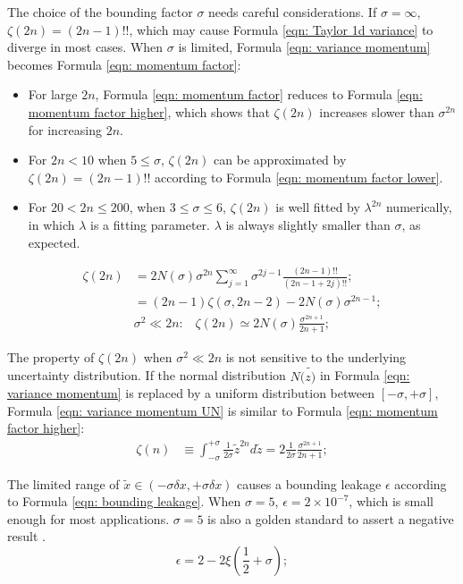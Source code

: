 \documentclass[twoside]{article}
\numberwithin{equation}{section}
\newcommand{\eqspace}{\;\;\;}
\begin{document}
The choice of the bounding factor $\sigma$ needs careful considerations.
If $\sigma = \infty$, $\zeta(2n) = (2n - 1)!!$, which may cause Formula \eqref{eqn: Taylor 1d variance} to diverge in most cases.
When $\sigma$ is limited, Formula \eqref{eqn: variance momentum} becomes Formula \eqref{eqn: momentum factor}:
\begin{itemize}
\item For large $2n$, Formula \eqref{eqn: momentum factor} reduces to Formula \eqref{eqn: momentum factor higher}, which shows that $\zeta(2n)$ increases slower than $\sigma^{2n}$ for increasing $2n$.

\item For $2n < 10$ when $5 \leq \sigma$, $\zeta(2n)$ can be approximated by $\zeta(2n) = (2n-1)!!$ according to Formula \eqref{eqn: momentum factor lower}.  

\item For $20 < 2n \leq 200$, when $3 \leq \sigma \leq 6$, $\zeta(2n)$ is well fitted by $\lambda^{2n}$ numerically, in which $\lambda$ is a fitting parameter. 
$\lambda$ is always slightly smaller than $\sigma$, as expected.
\end{itemize}
\begin{align}
\label{eqn: momentum factor} 
\zeta(2n) &= 2 N(\sigma) \sigma^{2n} \sum_{j=1}^{\infty} \sigma^{2j-1} \frac{(2n - 1)!!}{(2n-1 + 2j)!!}; \\
\label{eqn: momentum factor lower} 
 &= (2n - 1) \zeta(\sigma, 2n - 2) - 2 N(\sigma) \sigma^{2n - 1}; \\
\label{eqn: momentum factor higher} 
&\sigma^2 \ll 2n:\eqspace \zeta(2n) \simeq 2 N(\sigma) \frac{\sigma^{2n+1}}{2n+1};
\end{align}

The property of $\zeta(2n)$ when $\sigma^2 \ll 2n$ is not sensitive to the underlying uncertainty distribution.  If the normal distribution $N(\tilde{z)}$ in Formula \eqref{eqn: variance momentum} is replaced by a uniform distribution between $[-\sigma, +\sigma]$,  Formula \eqref{eqn: variance momentum UN} is similar to Formula \eqref{eqn: momentum factor higher}:
\begin{align}
\label{eqn: variance momentum UN}
\zeta(n) &\equiv \int_{-\sigma}^{+\sigma} \frac{1}{2 \sigma} \tilde{z}^{2n} d \tilde{z} = 2 \frac{1}{2 \sigma} \frac{{\sigma}^{2n+1}}{2n + 1}; 
\end{align}

The limited range of $\tilde{x} \in (-\sigma \delta x, +\sigma \delta x)$ causes a bounding leakage $\epsilon$ according to Formula \eqref{eqn: bounding leakage}.
When $\sigma = 5$, $\epsilon = 2 \times 10^{-7}$, which is small enough for most applications.
$\sigma = 5$ is also a golden standard to assert a negative result \cite{Precisions_Physical_Measurements}.
\begin{equation}
\label{eqn: bounding leakage}
\epsilon = 2 - 2 \xi(\frac{1}{2} + \sigma);
\end{equation}
\end{document}
